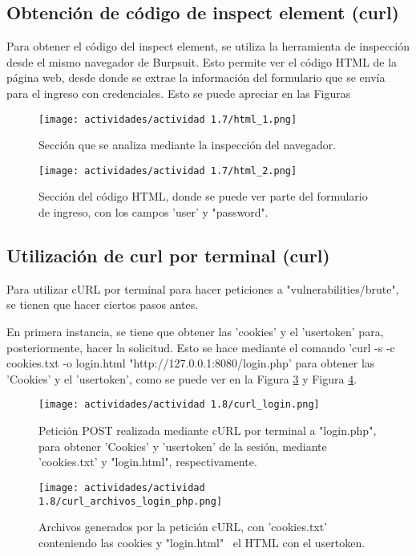 \documentclass[letter,12pt]{article}
\begin{document}
\subsection{Obtención de código de inspect element (curl)}
Para obtener el código del inspect element, se utiliza la herramienta de inspección desde el mismo navegador de Burpsuit. Esto permite ver el código HTML de la página web, desde donde se extrae la información del formulario que se envía para el ingreso con credenciales. Esto se puede apreciar en las Figuras 

\begin{figure}[H]
    \centering
    \texttt{[image: actividades/actividad 1.7/html\_1.png]}
    \caption{Sección que se analiza mediante la inspección del navegador.}
    \label{actividad 1.7 html_1}
\end{figure}

\begin{figure}[H]
    \centering
    \texttt{[image: actividades/actividad 1.7/html\_2.png]}
    \caption{Sección del código HTML, donde se puede ver parte del formulario de ingreso, con los campos 'user' y "password".}
    \label{actividad 1.7 html_2}
\end{figure}

\subsection{Utilización de curl por terminal (curl)}
Para utilizar cURL por terminal para hacer peticiones a "vulnerabilities/brute", se tienen que hacer ciertos pasos antes. 

En primera instancia, se tiene que obtener las 'cookies' y el 'usertoken' para, posteriormente, hacer la solicitud. Esto se hace mediante el comando 'curl -s -c cookies.txt -o login.html "http://127.0.0.1:8080/login.php' para obtener las 'Cookies' y el 'usertoken', como se puede ver en la Figura \ref{actividad 1.8 curl_login}
y Figura \ref{actividad 1.8 curl_archivos}.

\begin{figure}[H]
    \centering
    \texttt{[image: actividades/actividad 1.8/curl\_login.png]}
    \caption{Petición POST realizada mediante cURL por terminal a "login.php", para obtener 'Cookies' y 'usertoken' de la sesión, mediante 'cookies.txt' y "login.html", respectivamente.}
    \label{actividad 1.8 curl_login}
\end{figure}

\begin{figure}[H]
    \centering
    \texttt{[image: actividades/actividad 1.8/curl\_archivos\_login\_php.png]}
    \caption{Archivos generados por la petición cURL, con 'cookies.txt' conteniendo las cookies y "login.html" \ el HTML con el usertoken.}
    \label{actividad 1.8 curl_archivos}
\end{figure}
\end{document}
